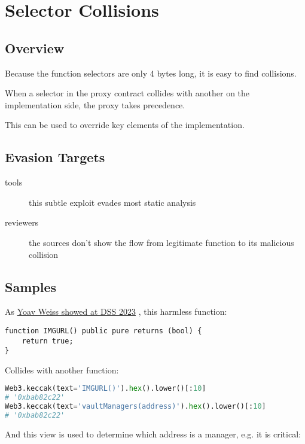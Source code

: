 \section{Selector Collisions} \label{sec:selector-collisions}

\subsection{Overview}

Because the function selectors are only 4 bytes long, it is easy to find collisions.

When a selector in the proxy contract collides with another on the implementation side, the proxy takes precedence.

This can be used to override key elements of the implementation.

\subsection{Evasion Targets}

\begin{description}
\item[tools]{this subtle exploit evades most static analysis}
\item[reviewers]{the sources don't show the flow from legitimate function to its malicious collision}
\end{description}

\subsection{Samples}

As \href{https://www.youtube.com/watch?v=l1wjRy2BYPg}{Yoav Weiss showed at DSS 2023} \cite{video-masquerading-code}, this harmless function:

\begin{lstlisting}[language=Solidity]
function IMGURL() public pure returns (bool) {
    return true;
}
\end{lstlisting}

Collides with another function:

\begin{lstlisting}[language=Python]
Web3.keccak(text='IMGURL()').hex().lower()[:10]
# '0xbab82c22'
Web3.keccak(text='vaultManagers(address)').hex().lower()[:10]
# '0xbab82c22'
\end{lstlisting}

And this view is used to determine which address is a manager, e.g. it is critical:

